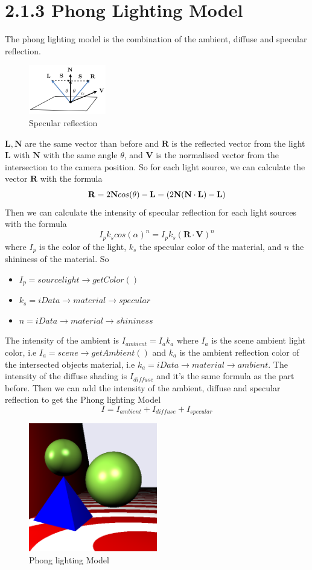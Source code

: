 \documentclass[10pt,a4paper]{report}
\begin{document}
\section*{2.1.3   Phong Lighting Model}
The phong lighting model is the combination of the ambient, diffuse and specular reflection.
\begin{figure}[h!]
\caption{Specular reflection}
  \centering
    \includegraphics[width=0.3\textwidth]{angleRV.png}
\end{figure}
$\mathbf{L,N}$ are the same vector than before and $\mathbf{R}$ is the reflected vector from the light $\mathbf{L}$ with $\mathbf{N}$ with the same angle $\theta$, and $\mathbf{V}$ is the normalised vector from the intersection to the camera position.
So for each light source, we can calculate the vector $\mathbf{R}$ with the formula $$\mathbf{R} = 2 \mathbf{N} cos(\theta)-\mathbf{L} = ( 2 \bf N(N \cdot L)-L)$$
Then we can calculate the intensity of specular reflection for each light sources with the formula $$I_p k_s cos(\alpha)^n = I_p k_s (\mathbf{R \cdot V})^n$$ where $I_p$ is the color of the light, $k_s$ the specular color of the material, and $n$ the shininess of the material. So 
\begin{itemize}
\item $I_p = sourcelight \rightarrow getColor()$
\item $k_s = iData \rightarrow material \rightarrow specular$
\item $n = iData \rightarrow material \rightarrow shininess$
\end{itemize}
The intensity of the ambient is $I_{ambient} = I_a k_a$ where $I_a$ is the scene ambient light color, i.e $I_a = scene \rightarrow getAmbient()$ and $k_a$ is the ambient reflection color of the intersected objects material, i.e $k_a = iData \rightarrow material \rightarrow ambient$.
The intensity of the diffuse shading is $I_{diffuse}$ and it's the same formula as the part before.
Then we can add the intensity of the ambient, diffuse and specular reflection to get the Phong lighting Model $$ I = I_{ambient} + I_{diffuse} + I_{specular}$$ 
\begin{figure}[h!]
\caption{Phong lighting Model}
  \centering
    \includegraphics[width=0.5\textwidth]{02_Exc_Raytracing_Framework/2_1_3.png}
\end{figure}
\newpage
\end{document}
